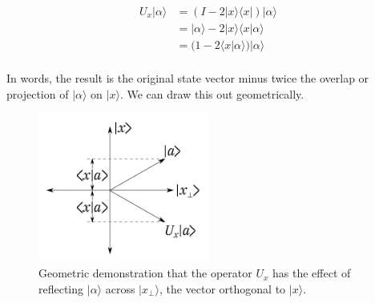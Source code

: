 \documentclass[12pt]{amsart}
\begin{document}
\begin{equation}
	\begin{split}
		U_x |\alpha\rangle & = (I - 2 |x\rangle\langle x| ) |\alpha\rangle \\
		& = |\alpha\rangle - 2 |x\rangle\langle x | \alpha\rangle \\
		& = (1 - 2 \langle x | \alpha\rangle)  |\alpha\rangle \\
	\end{split}
\end{equation}

In words, the result is the original state vector minus twice the overlap or projection of $|\alpha\rangle$ on $|x\rangle$. We can draw this out geometrically.
\begin{figure}[h]
   \centering
   \includegraphics[width=0.5\textwidth]{./img/fig-00} %
   \caption{Geometric demonstration that the operator $U_x$ has the effect of reflecting $|\alpha\rangle$ across $|x_\perp\rangle$, the vector orthogonal to $|x\rangle$.}
   \label{fig:example}
\end{figure}
\end{document}

